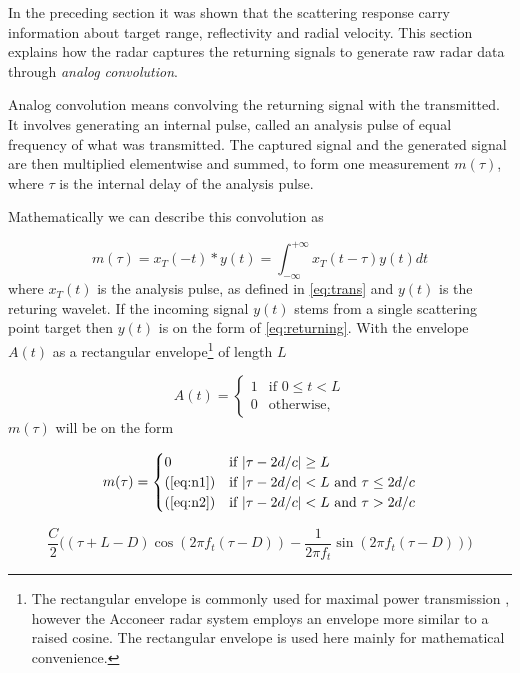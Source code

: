 In the preceding section it was shown that the scattering response carry information about target range, reflectivity and radial velocity. This section explains how the radar captures the returning signals to generate raw radar data through \emph{analog convolution}.

Analog convolution means convolving the returning signal with the transmitted. It involves generating an internal pulse, called an analysis pulse of equal frequency of what was transmitted. The captured signal and the generated signal are then multiplied elementwise and summed, to form one measurement $m(\tau)$, where $\tau$ is the internal delay of the analysis pulse. 

Mathematically we can describe this convolution as

\begin{equation}
	m(\tau) 
	= x_T(-t) * y(t)
	= \int_{-\infty}^{+\infty} x_T(t - \tau)y(t) dt
\end{equation}
where $x_T(t)$ is the analysis pulse, as defined in \ref{eq:trans} and $y(t)$ is the returing wavelet. If the incoming signal $y(t)$ stems from a single scattering point target then $y(t)$ is on the form of \ref{eq:returning}. With the envelope $A(t)$ as a rectangular envelope\footnote{The rectangular envelope is commonly used for maximal power transmission \citep{richards_2014}, however the Acconeer radar system employs an envelope more similar to a raised cosine. The rectangular envelope is used here mainly for mathematical convenience.} of length $L$

\begin{equation}
	A(t) = \begin{cases}
		1 & \text{if $0\leq t < L$} \\
		0 & \text{otherwise},
	\end{cases}
\end{equation}
$m(\tau)$ will be on the form 

\begin{equation}\label{eq:n0}
	m(\tau) = 
	\begin{cases}
		0 & \text{if $|\tau-2d/c|\geq L$} \\
		\text{(\ref{eq:n1})} & \text{if $|\tau-2d/c|<L$ and $\tau \leq 2d/c$} \\
		\text{(\ref{eq:n2})} & \text{if $|\tau-2d/c|<L$ and $\tau > 2d/c$}
	\end{cases}
\end{equation}

\begin{equation}\label{eq:n1}
	\frac{C}{2}\Big((\tau + L - D)\cos(2\pi f_t(\tau - D)) 
	- \frac{1}{2\pi f_t}\sin(2\pi f_t(\tau - D))\Big)
\end{equation}

